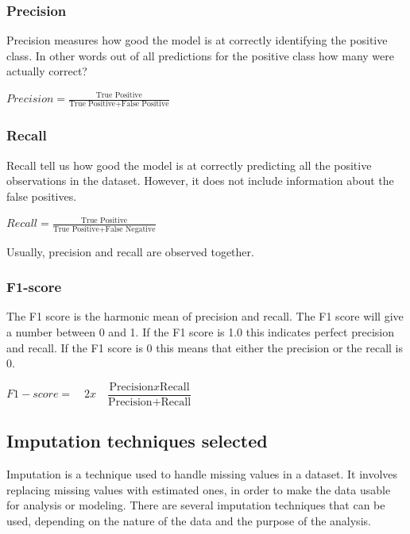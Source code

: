 \documentclass{article}
\begin{document}
\subsubsection*{Precision}
Precision measures how good the model is at correctly identifying the positive class. In other words out of all predictions for the positive class how many were actually correct?
\begin{center}
    \begin{math}
        Precision = \frac{\mbox{True Positive}}{\mbox{True Positive} + \mbox{False Positive}}
    \end{math}
\end{center}

\subsubsection*{Recall}
Recall tell us how good the model is at correctly predicting all the positive observations in the dataset. However, it does not include information about the false positives. 
\begin{center}
    \begin{math}
        Recall = \frac{\mbox{True Positive}}{\mbox{True Positive} + \mbox{False Negative}}
    \end{math}
\end{center}
Usually, precision and recall are observed together. 

\subsubsection*{F1-score}
The F1 score is the harmonic mean of precision and recall. The F1 score will give a number between 0 and 1. If the F1 score is 1.0 this indicates perfect precision and recall. If the F1 score is 0 this means that either the precision or the recall is 0.
\begin{center}
    \begin{math}
        F1-score =\quad \mbox{2} x \quad\dfrac{\mbox{Precision} x \mbox{Recall}}{\mbox{Precision} + \mbox{Recall}} 
    \end{math} 
\end{center}





\subsection{Imputation techniques selected}
Imputation is a technique used to handle missing values in a dataset. It involves replacing missing values with estimated ones, in order to make the data usable for analysis or modeling. There are several imputation techniques that can be used, depending on the nature of the data and the purpose of the analysis.
\end{document}

